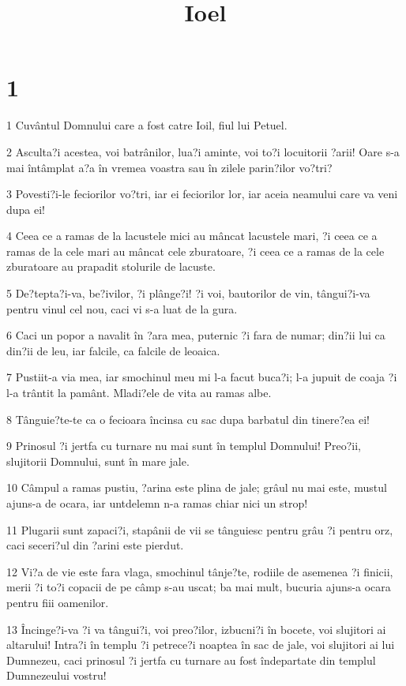 

\title{Ioel}


\chapter{1}

\par 1 Cuvântul Domnului care a fost catre Ioil, fiul lui Petuel.
\par 2 Asculta?i acestea, voi batrânilor, lua?i aminte, voi to?i locuitorii ?arii! Oare s-a mai întâmplat a?a în vremea voastra sau în zilele parin?ilor vo?tri?
\par 3 Povesti?i-le feciorilor vo?tri, iar ei feciorilor lor, iar aceia neamului care va veni dupa ei!
\par 4 Ceea ce a ramas de la lacustele mici au mâncat lacustele mari, ?i ceea ce a ramas de la cele mari au mâncat cele zburatoare, ?i ceea ce a ramas de la cele zburatoare au prapadit stolurile de lacuste.
\par 5 De?tepta?i-va, be?ivilor, ?i plânge?i! ?i voi, bautorilor de vin, tângui?i-va pentru vinul cel nou, caci vi s-a luat de la gura.
\par 6 Caci un popor a navalit în ?ara mea, puternic ?i fara de numar; din?ii lui ca din?ii de leu, iar falcile, ca falcile de leoaica.
\par 7 Pustiit-a via mea, iar smochinul meu mi l-a facut buca?i; l-a jupuit de coaja ?i l-a trântit la pamânt. Mladi?ele de vita au ramas albe.
\par 8 Tânguie?te-te ca o fecioara încinsa cu sac dupa barbatul din tinere?ea ei!
\par 9 Prinosul ?i jertfa cu turnare nu mai sunt în templul Domnului! Preo?ii, slujitorii Domnului, sunt în mare jale.
\par 10 Câmpul a ramas pustiu, ?arina este plina de jale; grâul nu mai este, mustul ajuns-a de ocara, iar untdelemn n-a ramas chiar nici un strop!
\par 11 Plugarii sunt zapaci?i, stapânii de vii se tânguiesc pentru grâu ?i pentru orz, caci seceri?ul din ?arini este pierdut.
\par 12 Vi?a de vie este fara vlaga, smochinul tânje?te, rodiile de asemenea ?i finicii, merii ?i to?i copacii de pe câmp s-au uscat; ba mai mult, bucuria ajuns-a ocara pentru fiii oamenilor.
\par 13 Încinge?i-va ?i va tângui?i, voi preo?ilor, izbucni?i în bocete, voi slujitori ai altarului! Intra?i în templu ?i petrece?i noaptea în sac de jale, voi slujitori ai lui Dumnezeu, caci prinosul ?i jertfa cu turnare au fost îndepartate din templul Dumnezeului vostru!
